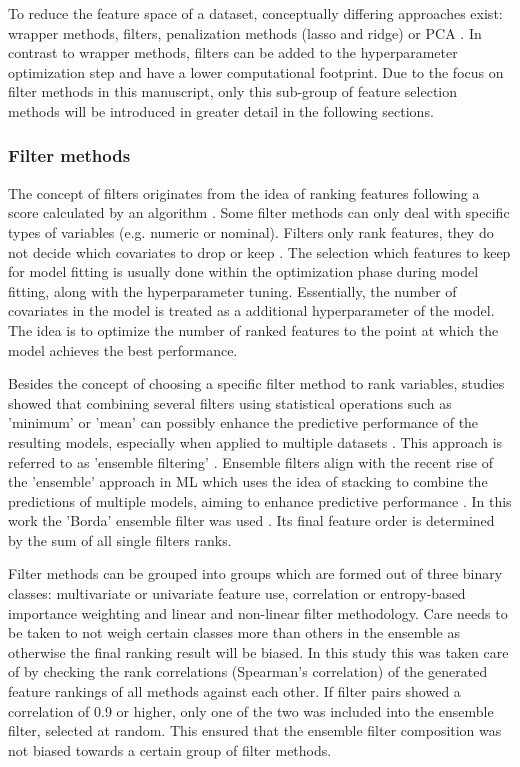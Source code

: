 \documentclass[remotesensing,article,submit,moreauthors,pdftex]{Definitions/mdpi}
\begin{document}
To reduce the feature space of a dataset, conceptually differing approaches exist: wrapper methods, filters, penalization methods (lasso and ridge) or \ac{PCA} \cite{bommert2020, das2001, guyon2003, jolliffe2016}.
In contrast to wrapper methods, filters can be added to the hyperparameter optimization step and have a lower computational footprint.
Due to the focus on filter methods in this manuscript, only this sub-group of feature selection methods will be introduced in greater detail in the following sections.

\subsubsection{Filter methods}

The concept of filters originates from the idea of ranking features following a score calculated by an algorithm \cite{guyon2003}.
Some filter methods can only deal with specific types of variables (e.g. numeric or nominal).
Filters only rank features, they do not decide which covariates to drop or keep \cite{drotar2015}.
The selection which features to keep for model fitting is usually done within the optimization phase during model fitting, along with the hyperparameter tuning.
Essentially, the number of covariates in the model is treated as a additional hyperparameter of the model.
The idea is to optimize the number of ranked features to the point at which the model achieves the best performance.

Besides the concept of choosing a specific filter method to rank variables, studies showed that combining several filters using statistical operations such as 'minimum' or 'mean' can possibly enhance the predictive performance of the resulting models, especially when applied to multiple datasets \cite{abeel2010, drotar2017a}.
This approach is referred to as 'ensemble filtering' \cite{dietterich2000}.
Ensemble filters align with the recent rise of the 'ensemble' approach in ML which uses the idea of stacking to combine the predictions of multiple models, aiming to enhance predictive performance \cite{polikar2012, feurer2015, bolon-canedo2019}.
In this work the 'Borda' ensemble filter was used \cite{drotar2017a}.
Its final feature order is determined by the sum of all single filters ranks.

Filter methods can be grouped into groups which are formed out of three binary classes: multivariate or univariate feature use, correlation or entropy-based importance weighting and linear and non-linear filter methodology.
Care needs to be taken to not weigh certain classes more than others in the ensemble as otherwise the final ranking result will be biased.
In this study this was taken care of by checking the rank correlations (Spearman's correlation) of the generated feature rankings of all methods against each other.
If filter pairs showed a correlation of 0.9 or higher, only one of the two was included into the ensemble filter, selected at random.
This ensured that the ensemble filter composition was not biased towards a certain group of filter methods.
\end{document}
